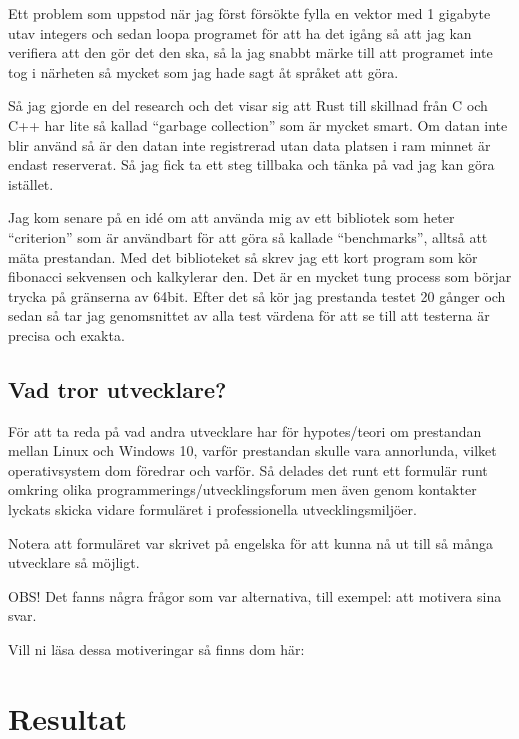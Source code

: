 \documentclass[12pt, a4paper]{report}
\begin{document}
Ett problem som uppstod när jag först försökte fylla en vektor med 1 gigabyte utav integers och sedan loopa programet för att ha det igång så att jag kan verifiera att den gör det den ska, så la jag snabbt märke till att programet inte tog i närheten så mycket som jag hade sagt åt språket att göra.

Så jag gjorde en del research och det visar sig att Rust till skillnad från C och C++ har lite så kallad ``garbage collection'' som är mycket smart. Om datan inte blir använd så är den datan inte registrerad utan data platsen i ram minnet är endast reserverat. Så jag fick ta ett steg tillbaka och tänka på vad jag kan göra istället.
 
Jag kom senare på en idé om att använda mig av ett bibliotek som heter ``criterion'' som är användbart för att göra så kallade ``benchmarks'', alltså att mäta prestandan. Med det biblioteket så skrev jag ett kort program som kör fibonacci sekvensen och kalkylerar den. Det är en mycket tung process som börjar trycka på gränserna av 64bit. Efter det så kör jag prestanda testet 20 gånger och sedan så tar jag genomsnittet av alla test värdena för att se till att testerna är precisa och exakta.
 
 
\subsection{Vad tror utvecklare?}
 
   För att ta reda på vad andra utvecklare har för hypotes/teori om prestandan mellan Linux och Windows 10, varför prestandan skulle vara annorlunda, vilket operativsystem dom föredrar och varför. Så delades det runt ett formulär runt omkring olika programmerings/utvecklingsforum men även genom kontakter lyckats skicka vidare formuläret i professionella utvecklingsmiljöer.
 
   Notera att formuläret var skrivet på engelska för att kunna nå ut till så många utvecklare så möjligt.
    
   \vspace{1cm}
 
 
   \small{OBS! Det fanns några frågor som var alternativa, till exempel: att motivera sina svar.
  
   Vill ni läsa dessa motiveringar så finns dom här:} 
 
\vspace{1cm}
\section{Resultat}
\end{document}
